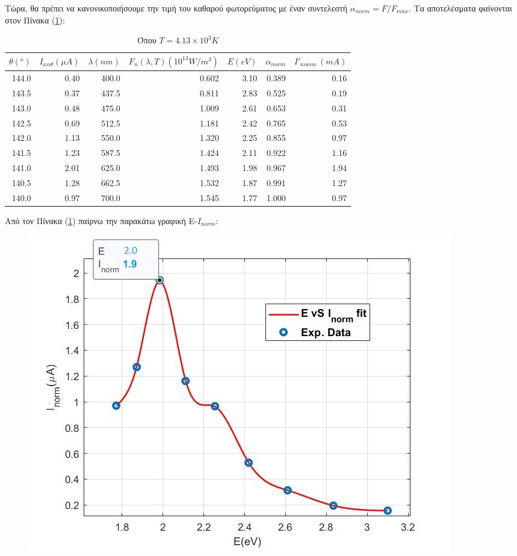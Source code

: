 \documentclass[a4paper]{article}
\begin{document}
		Τώρα, θα πρέπει να κανονικοποιήσουμε την τιμή του καθαρού φωτορεύματος με έναν συντελεστή $\alpha_{norm}=F/F_{max}$. Τα αποτελέσματα φαίνονται στον Πίνακα (\ref{mat4}): 
		\begin{table}[h!]
			\centering
			\begin{tabular}{r|r|r|r|r|r|r}
			$\theta(^o)$ & $I_{\kappa\alpha\theta}(\mu A)$ & $\lambda(nm)$ & $F_n(\lambda,T)(10^{13}W/m^3)$ & $ E(eV)$ & $\alpha_{norm}$ & $I'_{\text{κανον.}}(mA)$ \\\hline\hline
	144.0 &0.40 & 400.0 & 0.602 & 3.10 & 0.389 & 0.16 \\
	143.5 &0.37 & 437.5 & 0.811 & 2.83 & 0.525 & 0.19 \\
	143.0 &0.48 & 475.0 & 1.009 & 2.61 & 0.653 & 0.31 \\
	142.5 &0.69 & 512.5 & 1.181 & 2.42 & 0.765 & 0.53 \\
	142.0 &1.13 & 550.0 & 1.320 & 2.25 & 0.855 & 0.97 \\
	141.5 &1.23 & 587.5 & 1.424 & 2.11 & 0.922 & 1.16 \\
	141.0 &2.01 & 625.0 & 1.493 & 1.98 & 0.967 & 1.94 \\
	140.5 &1.28 & 662.5 & 1.532 & 1.87 & 0.991 & 1.27 \\
	140.0 &0.97	& 700.0 &	1.545 &	1.77 & 1.000 & 0.97 \\
			\end{tabular}
			\caption{Όπου $T=4.13\times10^3K$ }
			\label{mat4}
		\end{table}
		
		Από τον Πίνακα (\ref{mat4}) παίρνω την παρακάτω γραφική E-$I_{norm}$:
			\begin{figure}[h!]
				\centering
				\includegraphics[scale=0.7]{plot4.jpg}
				\caption{ }
				\label{im4}				
			\end{figure}
			
\end{document}

